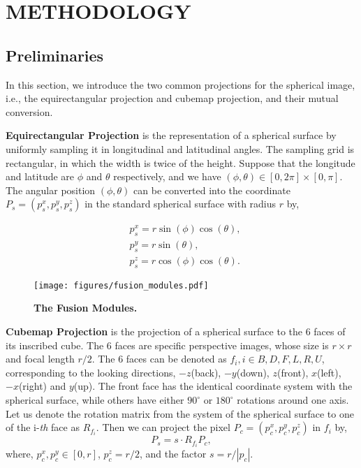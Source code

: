 \documentclass[letterpaper, 10 pt, conference]{ieeeconf}
\begin{document}
\section{METHODOLOGY}
\subsection{Preliminaries}
In this section, we introduce the two common projections for the spherical image, i.e., the equirectangular projection and cubemap projection, and their mutual conversion. 

\textbf{Equirectangular Projection} is the representation of a spherical surface by uniformly sampling it in longitudinal and latitudinal angles. The sampling grid is rectangular, in which the width is twice of the height. Suppose that the longitude and latitude are $\phi$ and $\theta$ respectively, and we have $(\phi,  \theta) \in [0, 2\pi] \times [0, \pi]$. The angular position $(\phi,  \theta)$ can be converted into the coordinate $P_s=(p_s^x, p_s^y, p_s^z)$ in the standard spherical surface with radius $r$ by, 

\begin{equation}
\begin{array}{rl}
	&p_s^x= r \sin(\phi)\cos(\theta), \\
	&p_s^y= r \sin(\theta), \\
	&p_s^z= r \cos(\phi)\cos(\theta).
\end{array}
\label{eq:equi}
\end{equation}


\begin{figure*}[t]
\vspace{5pt}
\begin{center}
\texttt{[image: figures/fusion\_modules.pdf]}
\end{center}
\caption{\textbf{The Fusion Modules.} }
\label{fig:modules}
\end{figure*}




\textbf{Cubemap Projection} is the projection of a spherical surface to the $6$ faces of its inscribed cube. The $6$ faces are specific perspective images, whose size is $r \times r$ and focal length $r/2$. The $6$ faces can be denoted as $f_i, i \in {B, D, F, L, R, U}$, corresponding to the looking directions, $-z$(back), $-y$(down), $z$(front), $x$(left), $-x$(right) and $y$(up). The front face has the identical coordinate system with the spherical surface, while others have either $90^{\circ}$ or $180^{\circ}$ rotations around one axis. Let us denote the rotation matrix from the system of the spherical surface to one of the i-\textit{th} face as $R_{f_i}$. Then we can project the pixel $P_c=(p_c^x, p_c^y, p_c^z)$ in $f_i$ by, 
\begin{equation}
P_s = s \cdot R_{f_i}  P_c, 
\label{eq:cube}
\end{equation}
where, $p_c^x, p_c^y \in [0, r]$, $p_c^z=r/2$, and the factor $s=r/|p_c|$.
\end{document}
